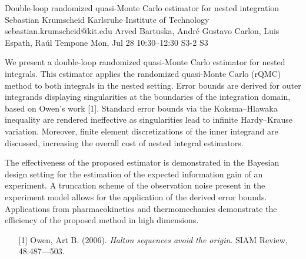 \begin{talk}
  {Double-loop randomized quasi-Monte Carlo estimator for nested integration}%
  {Sebastian Krumscheid}%
  {Karlsruhe Institute of Technology}%
  {sebastian.krumscheid@kit.edu}%
  {Arved Bartuska, Andr\'{e} Gustavo Carlon, Luis Espath, Ra\'{u}l Tempone}%
  {}%
  {Mon, Jul 28 10:30–12:30}%
  {S3-2}%
  {S3}%
  
				
			
We present a double-loop randomized quasi-Monte Carlo estimator for nested integrals. This estimator applies the randomized quasi-Monte Carlo (rQMC) method to both integrals in the nested setting. Error bounds are derived for outer integrands displaying singularities at the boundaries of the integration domain, based on Owen's work [1]. Standard error bounds via the Koksma--Hlawaka inequality are rendered ineffective as singularities lead to infinite Hardy--Krause variation. Moreover, finite element discretizations of the inner integrand are discussed, increasing the overall cost of nested integral estimators. 

The effectiveness of the proposed estimator is demonstrated in the Bayesian design setting for the estimation of the expected information gain of an experiment. A truncation scheme of the observation noise present in the experiment model allows for the application of the derived error bounds. Applications from pharmacokinetics and thermomechanics demonstrate the efficiency of the proposed method in high dimensions.

\medskip

\begin{enumerate}
	\item[{[1]}] Owen, Art B. (2006). {\it Halton sequences avoid the origin}. SIAM Review, 48:487---503.
\end{enumerate}

\end{talk}

